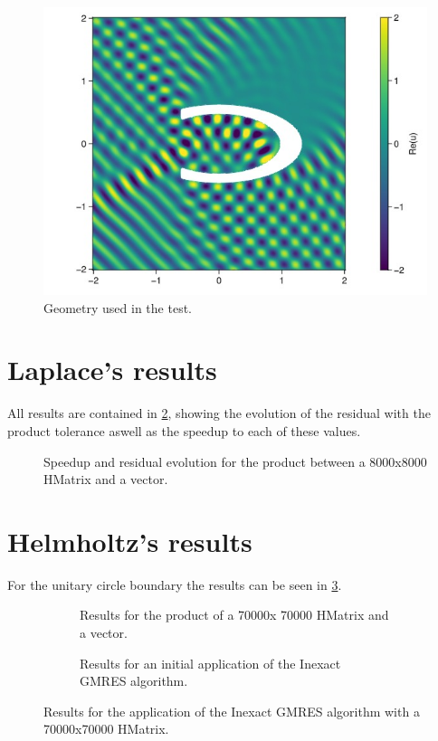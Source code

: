 \begin{figure}[h!]
    \centering
    \includegraphics[width=0.6\linewidth]{images/cavity_fig.jpg}
    \caption{Geometry used in the test.}
    \label{fig:cavity_fig}
\end{figure}


\section{Laplace's results}

All results are contained in \ref{fig:laplace_results}, showing the evolution of the residual with the product tolerance aswell as the speedup to each of these values.

\begin{figure}[h!]
    \centering
    
    \caption{Speedup and residual evolution for the product between a 8000x8000 HMatrix and a vector.}
    \label{fig:laplace_results}
\end{figure}

\section{Helmholtz's results}


For the unitary circle boundary the results can be seen in \ref{fig:Helmholtz_circle_results}.

\begin{figure}[h!]
    \centering
    \begin{subfigure}[b]{0.45\linewidth}
        
        \caption{Results for the product of a 70000x 70000 HMatrix and a vector.}
    \end{subfigure}
    \begin{subfigure}[b]{0.45\linewidth}
        
        \caption{Results for an initial application of the Inexact GMRES algorithm.}
    \end{subfigure}
    \caption{Results for the application of the Inexact GMRES algorithm with a 70000x70000 HMatrix.}
    \label{fig:Helmholtz_circle_results}
\end{figure}


